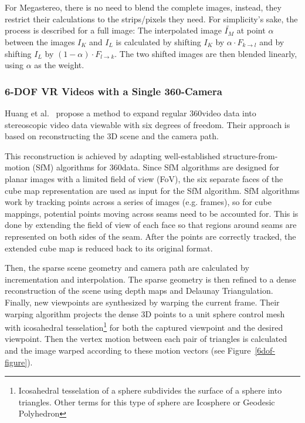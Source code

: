 For Megastereo, there is no need to blend the complete images, instead, they restrict their calculations to the strips/pixels they need. For simplicity's sake, the process is described for a full image:
The interpolated image $\widetilde{I_M}$ at point $\alpha$ between the images $I_K$ and $I_L$ is calculated by shifting $I_K$ by $\alpha \cdot F_{k\rightarrow l}$ and by shifting $I_L$ by $(1 - \alpha) \cdot F_{l\rightarrow k}$. The two shifted images are then blended linearly, using $\alpha$ as the weight.

\subsubsection{6-DOF VR Videos with a Single 360-Camera}
Huang et al.\ \cite{6dof} propose a method to expand regular 360\degree video data into stereoscopic video data viewable with six degrees of freedom. Their approach is based on reconstructing the 3D scene and the camera path.

This reconstruction is achieved by adapting well-established structure-from-motion (SfM) algorithms for 360\degree data. Since SfM algorithms are designed for planar images with a limited field of view (FoV), the six separate faces of the cube map representation are used as input for the SfM algorithm. SfM algorithms work by tracking points across a series of images (e.g. frames), so for cube mappings, potential points moving across seams need to be accounted for. This is done by extending the field of view of each face so that regions around seams are represented on both sides of the seam. After the points are correctly tracked, the extended cube map is reduced back to its original format.

Then, the sparse scene geometry and camera path are calculated by incrementation and interpolation. The sparse geometry is then refined to a dense reconstruction of the scene using depth maps and Delaunay Triangulation. Finally, new viewpoints are synthesized by warping the current frame. Their warping algorithm projects the dense 3D points to a unit sphere control mesh with icosahedral tesselation\footnote{Icosahedral tesselation of a sphere subdivides the surface of a sphere into triangles. Other terms for this type of sphere are Icosphere or Geodesic Polyhedron} for both the captured viewpoint and the desired viewpoint. Then the vertex motion between each pair of triangles is calculated and the image warped according to these motion vectors (see Figure~\ref{6dof-figure}). 

